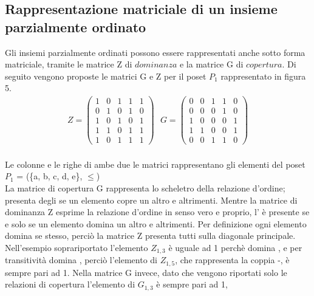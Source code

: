 \documentclass[12pt]{article}
\begin{document}
\subsection{Rappresentazione matriciale di un insieme parzialmente ordinato}

Gli insiemi parzialmente ordinati possono essere rappresentati anche sotto forma matriciale, tramite le matrice Z di $\textit{dominanza}$
e la matrice G di $\textit{copertura}$. Di seguito vengono proposte le matrici G e Z per il poset $P_1$ rappresentato in figura 5. 
\begin{align}
    Z = 
    \left( \begin{array}{ccccc} 1 & 0 & 1 & 1 & 1 \\
        0 & 1 & 0 & 1 & 0\\
        1 & 0 & 1 & 0 & 1\\
        1 & 1 & 0 & 1 & 1\\
        1 & 0 & 1 & 1 & 1 \end{array} \right)
    \mbox{                  }
    G = 
    \left( \begin{array}{ccccc} 0 & 0 & 1 & 1 & 0 \\
        0 & 0 & 0 & 1 & 0\\
        1 & 0 & 0 & 0 & 1\\
        1 & 1 & 0 & 0 & 1\\
        0 & 0 & 1 & 1 & 0 \end{array} \right)
\end{align}
\\
Le colonne e le righe di ambe due le matrici rappresentano gli elementi del poset $P_1$ = (\{a, b, c, d, e\}, $\leq$) \\
La matrice di copertura G rappresenta lo scheletro della relazione d'ordine; presenta degli  se un elemento copre un 
altro e  altrimenti. Mentre la matrice di dominanza Z esprime la relazione d'ordine in senso vero e proprio, l'
è presente se e solo se un elemento domina un altro e  altrimenti. Per definizione ogni elemento domina se stesso, 
perciò la matrice Z presenta tutti  sulla diagonale principale. \\
Nell'esempio soprariportato l'elemento $Z_{1,3}$ è uguale ad 1 perchè  domina , e per transitività  domina
, perciò l'elemento di $Z_{1,5}$, che rappresenta la coppia -, è sempre pari ad 1. 
Nella matrice G invece, dato che vengono riportati solo le relazioni di copertura l'elemento di $G_{1,3}$ è sempre pari ad 1, 
\end{document}
